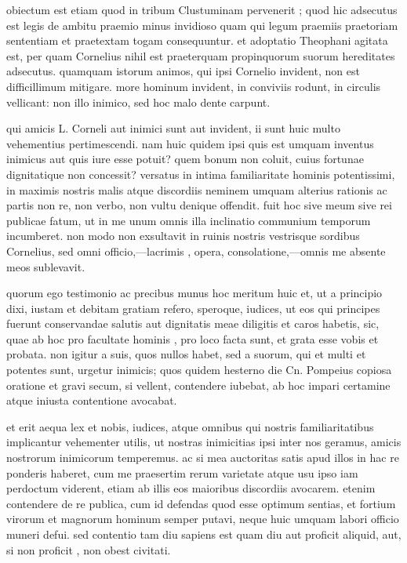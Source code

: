  obiectum est etiam quod in tribum Clustuminam pervenerit ; quod hic adsecutus est legis de ambitu praemio minus invidioso quam qui legum praemiis praetoriam sententiam et praetextam togam consequuntur. et adoptatio Theophani agitata est, per quam Cornelius nihil est praeterquam propinquorum suorum hereditates adsecutus. quamquam istorum animos, qui ipsi Cornelio invident, non est difficillimum mitigare. more hominum invident, in conviviis rodunt, in circulis vellicant: non illo inimico, sed hoc malo dente carpunt.

 qui amicis L. Corneli aut inimici sunt aut invident, ii sunt huic multo vehementius pertimescendi. nam huic quidem ipsi quis est umquam inventus inimicus aut quis iure esse potuit? quem bonum non coluit, cuius fortunae dignitatique non concessit? versatus in intima familiaritate hominis potentissimi, in maximis nostris malis atque discordiis neminem umquam alterius rationis ac partis non re, non verbo, non vultu denique offendit. fuit hoc sive meum sive rei publicae fatum, ut in me unum omnis illa inclinatio communium temporum incumberet. non modo non exsultavit in ruinis nostris vestrisque sordibus Cornelius, sed omni officio,—lacrimis , opera, consolatione,—omnis me absente meos sublevavit.

 quorum ego testimonio ac precibus munus hoc meritum huic et, ut a principio dixi, iustam et debitam gratiam refero, speroque, iudices, ut eos qui principes fuerunt conservandae salutis aut dignitatis meae diligitis et caros habetis, sic, quae ab hoc pro facultate hominis , pro loco facta sunt, et grata esse vobis et probata. non igitur a suis, quos nullos habet, sed a suorum, qui et multi et potentes sunt, urgetur inimicis; quos quidem hesterno die Cn. Pompeius copiosa oratione et gravi secum, si vellent, contendere iubebat, ab hoc impari certamine atque iniusta contentione avocabat.

 et erit aequa lex et nobis, iudices, atque omnibus qui nostris familiaritatibus implicantur vehementer utilis, ut nostras inimicitias ipsi inter nos geramus, amicis nostrorum inimicorum temperemus. ac si mea auctoritas satis apud illos in hac re ponderis haberet, cum me praesertim rerum varietate atque usu ipso iam perdoctum viderent, etiam ab illis eos maioribus discordiis avocarem. etenim contendere de re publica, cum id defendas quod esse optimum sentias, et fortium virorum et magnorum hominum semper putavi, neque huic umquam labori officio muneri defui. sed contentio tam diu sapiens est quam diu aut proficit aliquid, aut, si non proficit , non obest civitati.

